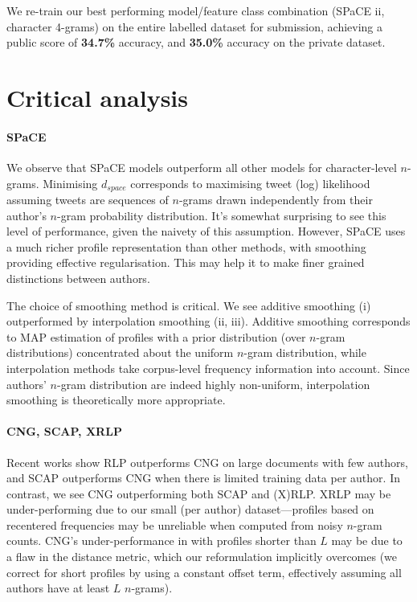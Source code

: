 \documentclass[twocolumn,10pt]{article}
\begin{document}
\vspace{-2ex}
We re-train our best performing model/feature class combination
(SPaCE ii, character 4-grams) on the entire labelled dataset for
submission,
achieving a public score of \textbf{34.7\%} accuracy,
and \textbf{35.0\%} accuracy on the private dataset.

\section{Critical analysis}


\paragraph{SPaCE}
We observe that SPaCE models outperform all other models for
character-level $n$-grams.
Minimising $d_{space}$ corresponds to maximising
tweet (log) likelihood assuming tweets are sequences of
$n$-grams drawn independently from their author's $n$-gram
probability distribution.
It's somewhat surprising to see this level of performance,
given the naivety of this assumption.
However, SPaCE uses a much richer profile representation
than other methods, with smoothing providing effective
regularisation. This may help it to make finer grained
distinctions between authors.

The choice of smoothing method is critical.
We see additive smoothing (i) outperformed by interpolation
smoothing (ii, iii).
Additive smoothing corresponds to
MAP estimation of profiles with a prior distribution 
(over $n$-gram distributions) concentrated about the uniform
$n$-gram distribution,
while interpolation methods take corpus-level frequency
information into account.
Since authors' $n$-gram distribution are indeed highly
non-uniform, interpolation smoothing is theoretically
more appropriate.


\paragraph{CNG, SCAP, XRLP} Recent works show RLP outperforms CNG
on large documents with few authors\supercite{layton2012recentred},
and SCAP outperforms CNG when there is limited training data per
author\supercite{frantzeskou2006effective}.
In contrast, we see CNG outperforming both SCAP and (X)RLP.
XRLP may be under-performing due to our small (per author)
dataset---profiles based on recentered frequencies may be unreliable
when computed from noisy $n$-gram counts.
CNG's under-performance in \cite{frantzeskou2006effective} with
profiles shorter than $L$ may be due to a flaw in the distance
metric, which our reformulation implicitly overcomes (we correct
for short profiles by using a constant offset term, effectively
assuming all authors have at least $L$ $n$-grams).
\end{document}
